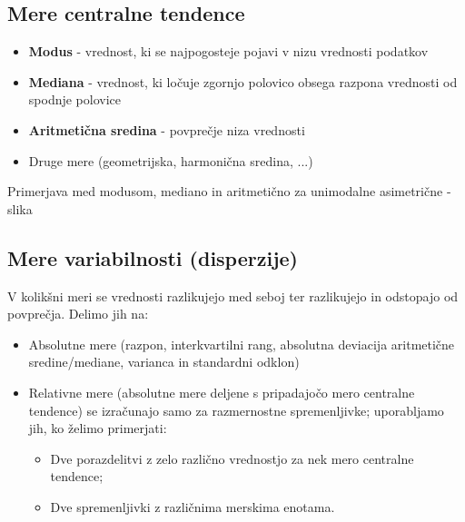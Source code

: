 \subsection*{Mere centralne tendence}
\begin{itemize}
    \item \textbf{Modus} - vrednost, ki se najpogosteje pojavi v nizu vrednosti podatkov
    \item \textbf{Mediana} - vrednost, ki ločuje zgornjo polovico obsega razpona vrednosti od spodnje polovice
    \item \textbf{Aritmetična sredina} - povprečje niza vrednosti
    \item Druge mere (geometrijska, harmonična sredina, ...)
\end{itemize}
Primerjava med modusom, mediano in aritmetično za unimodalne asimetrične - slika

\subsection*{Mere variabilnosti (disperzije)}
V kolikšni meri se vrednosti razlikujejo med seboj ter razlikujejo in odstopajo od povprečja. Delimo jih na:
\begin{itemize}
    \item Absolutne mere (razpon, interkvartilni rang, absolutna deviacija aritmetične sredine/mediane, varianca in standardni odklon) 
    \item Relativne mere (absolutne mere deljene s pripadajočo mero centralne tendence) se izračunajo samo za razmernostne spremenljivke; uporabljamo jih, ko želimo primerjati:
    \begin{itemize}
        \item Dve porazdelitvi z zelo različno vrednostjo za nek mero centralne tendence;
        \item Dve spremenljivki z različnima merskima enotama.
    \end{itemize}
\end{itemize}


